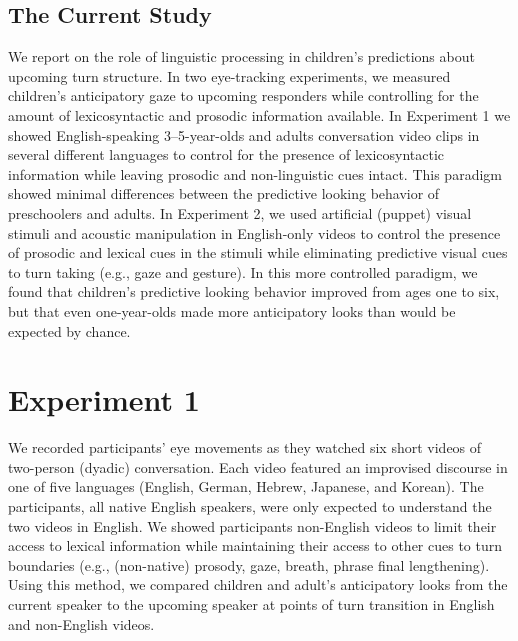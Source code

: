 \documentclass[authoryear, 12pt]{elsarticle}
\begin{document}
\subsection{The Current Study}
We report on the role of linguistic processing in children's predictions about upcoming turn structure. In two eye-tracking experiments, we measured children's anticipatory gaze to upcoming responders while controlling for the amount of lexicosyntactic and prosodic information available. In Experiment 1 we showed English-speaking 3--5-year-olds and adults conversation video clips in several different languages to control for the presence of lexicosyntactic information while leaving prosodic and non-linguistic cues intact. This paradigm showed minimal differences between the predictive looking behavior of preschoolers and adults. In Experiment 2, we used artificial (puppet) visual stimuli and acoustic manipulation in English-only videos to control the presence of prosodic and lexical cues in the stimuli while eliminating predictive visual cues to turn taking (e.g., gaze and gesture). In this more controlled paradigm, we found that children's predictive looking behavior improved from ages one to six, but that even one-year-olds made more anticipatory looks than would be expected by chance. 



\section{Experiment 1}
\label{sec:exp1}

We recorded participants' eye movements as they watched six short videos of two-person (dyadic) conversation. Each video featured an improvised discourse in one of five languages (English, German, Hebrew, Japanese, and Korean). The participants, all native English speakers, were only expected to understand the two videos in English. We showed participants non-English videos to limit their access to lexical information while maintaining their access to other cues to turn boundaries (e.g., (non-native) prosody, gaze, breath, phrase final lengthening). Using this method, we compared children and adult's anticipatory looks from the current speaker to the upcoming speaker at points of turn transition in English and non-English videos.
\end{document}
